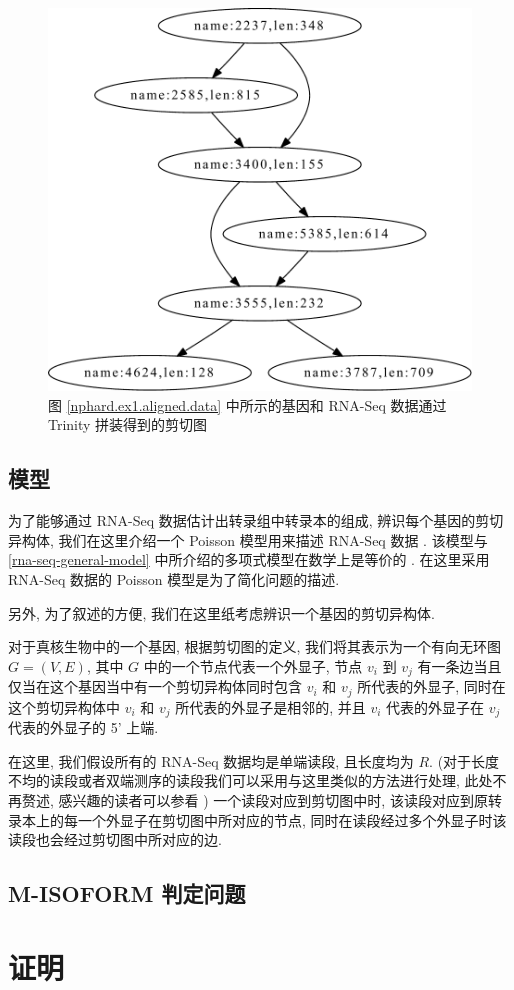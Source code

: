 \begin{figure}[!t]
\centering
\includegraphics[width=\textwidth]{figures/nphard/comp1.pdf}
\caption{图 \ref{nphard.ex1.aligned.data} 中所示的基因和 
RNA-Seq 数据通过 Trinity 拼装得到的剪切图}
\label{nphard.ex1.splicing.graph}
\end{figure}

\subsection{模型}

为了能够通过 RNA-Seq 数据估计出转录组中转录本的组成, 辨识每个基因的剪切异构体, 
我们在这里介绍一个 Poisson 模型用来描述 RNA-Seq 数据 \cite{Jiang15042009}. 
该模型与 \ref{rna-seq-general-model} 中所介绍的多项式模型在数学上是等价的 
\cite{2011arXiv1104.3889P}. 
在这里采用 RNA-Seq 数据的 Poisson 模型是为了简化问题的描述. 

另外, 为了叙述的方便, 我们在这里纸考虑辨识一个基因的剪切异构体. 

对于真核生物中的一个基因, 根据剪切图的定义, 
我们将其表示为一个有向无环图 $G=(V,E)$, 其中 $G$ 中的一个节点代表一个外显子, 
节点 $v_i$ 到 $v_j$ 有一条边当且仅当在这个基因当中有一个剪切异构体同时包含 
$v_i$ 和 $v_j$ 所代表的外显子, 
同时在这个剪切异构体中 $v_i$ 和 $v_j$ 所代表的外显子是相邻的, 
并且 $v_i$ 代表的外显子在 $v_j$ 代表的外显子的 5' 上端. 

在这里, 我们假设所有的 RNA-Seq 数据均是单端读段, 且长度均为 $R$. 
(对于长度不均的读段或者双端测序的读段我们可以采用与这里类似的方法进行处理, 
此处不再赘述, 感兴趣的读者可以参看 ) 
一个读段对应到剪切图中时, 该读段对应到原转录本上的每一个外显子在剪切图中所对应的节点, 
同时在读段经过多个外显子时该读段也会经过剪切图中所对应的边. 

\subsection{M-ISOFORM 判定问题}

\section{证明}

